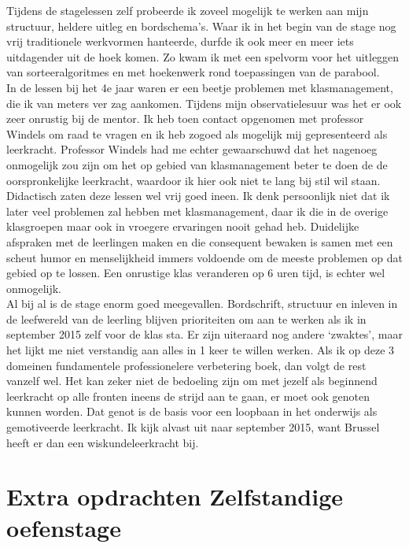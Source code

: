 \documentclass[a4paper,11pt]{article}
\theoremstyle{definition}
\begin{document}
\noindent Tijdens de stagelessen zelf probeerde ik zoveel mogelijk te werken aan 
mijn structuur, heldere uitleg en bordschema's. Waar ik in het begin van de 
stage nog vrij traditionele werkvormen hanteerde, durfde ik ook meer en meer 
iets uitdagender uit de hoek komen. Zo kwam ik met een spelvorm voor het 
uitleggen van sorteeralgoritmes en met hoekenwerk rond toepassingen van de 
parabool.\\

\noindent In de lessen bij het 4e jaar waren er een beetje problemen met 
klasmanagement, die ik van meters ver zag aankomen. Tijdens mijn observatielesuur 
was het er ook zeer onrustig bij de mentor. Ik heb toen contact opgenomen met 
professor Windels om raad te vragen en ik heb zogoed als mogelijk mij 
gepresenteerd als leerkracht. Professor Windels had me echter gewaarschuwd dat 
het nagenoeg onmogelijk zou zijn om het op gebied van klasmanagement beter te 
doen de de oorspronkelijke leerkracht, waardoor ik hier ook niet te lang bij 
stil wil staan. Didactisch zaten deze lessen wel vrij goed ineen. Ik denk 
persoonlijk niet dat ik later veel problemen zal hebben met klasmanagement, daar 
ik die in de overige klasgroepen maar ook in vroegere ervaringen nooit gehad 
heb. Duidelijke afspraken met de leerlingen maken en die consequent bewaken is 
samen met een scheut humor en menselijkheid immers voldoende om de meeste 
problemen op dat gebied op te lossen. Een onrustige klas veranderen op 6 uren tijd, is echter wel onmogelijk.\\ 

\noindent Al bij al is de stage enorm goed meegevallen. Bordschrift, structuur 
en inleven in de leefwereld van de leerling blijven prioriteiten om aan te 
werken als ik in september 2015 zelf voor de klas sta. Er zijn uiteraard nog 
andere `zwaktes', maar het lijkt me niet verstandig aan alles in 1 keer te 
willen werken. Als ik op deze 3 domeinen fundamentele professionelere 
verbetering boek, dan volgt de rest vanzelf wel. Het kan zeker niet de bedoeling 
zijn om met jezelf als beginnend leerkracht op alle fronten ineens de strijd aan te 
gaan, er moet ook genoten kunnen worden. Dat genot is de basis voor een loopbaan 
in het onderwijs als gemotiveerde leerkracht. Ik kijk alvast uit naar september 
2015, want Brussel heeft er dan een wiskundeleerkracht bij.
\newpage
\section{Extra opdrachten Zelfstandige oefenstage}
\end{document}
